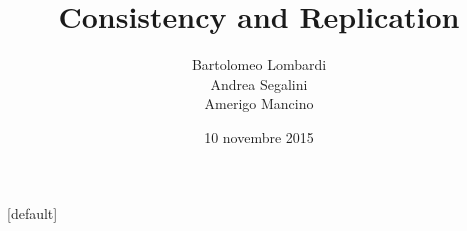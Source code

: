 \documentclass[10pt]{beamer}
\title{Consistency and Replication}
\author{Bartolomeo Lombardi \\ Andrea Segalini \\ Amerigo Mancino}
\date{10 novembre 2015}
\theoremstyle{definition}
\begin{document}
{
\makeatletter
    [default]
    \def\beamer@entrycode{\vspace*{-\headheight}}
\makeatother
\begin{frame}
	\maketitle
\end{frame}
}






\end{document}
